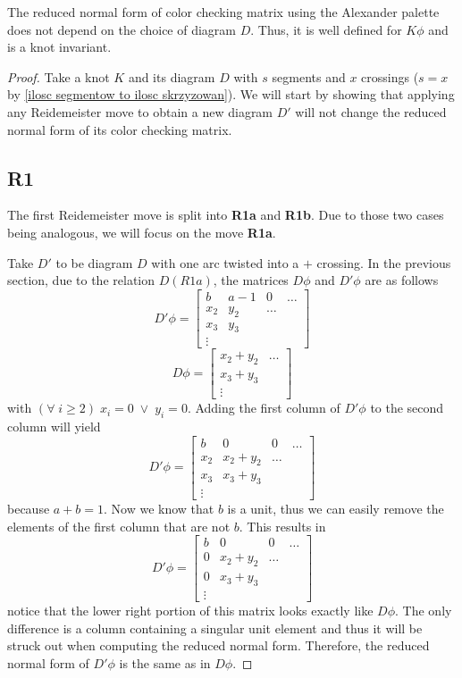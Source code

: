 \begin{theorem}
  The reduced normal form of color checking matrix using the Alexander palette does not depend on the choice of diagram $D$. Thus, it is well defined for $K\phi$ and is a knot invariant.
\end{theorem}

\begin{proof}
  Take a knot $K$ and its diagram $D$ with $s$ segments and $x$ crossings ($s=x$ by \cref{ilosc segmentow to ilosc skrzyzowan}). We will start by showing that applying any Reidemeister move to obtain a new diagram $D'$ will not change the reduced normal form of its color checking matrix.

  \subsection*{\centering R1}

  The first Reidemeister move is split into \textbf{R1a} and \textbf{R1b}. Due to those two cases being analogous, we will focus on the move \textbf{R1a}.

  Take $D'$ to be diagram $D$ with one arc twisted into a $+$ crossing. In the previous section, due to the relation $D(R1a)$, the matrices $D\phi$ and $D'\phi$ are as follows
  $$
  D'\phi=
  \begin{bmatrix}
    b & a-1 & 0 & \hdots\\ 
    x_2 & y_2 & \hdots \\ 
    x_3 & y_3 \\ 
    \vdots 
  \end{bmatrix}
  $$
  $$
  D\phi=
  \begin{bmatrix}
    x_2 + y_2 & \hdots \\ 
    x_3 + y_3 \\ 
    \vdots
  \end{bmatrix}
  $$
  with $(\forall\; i\geq 2)\;x_i=0\;\lor\; y_i=0$. Adding the first column of $D'\phi$ to the second column will yield 
  $$
  D'\phi=
  \begin{bmatrix}
    b & 0 & 0 & \hdots\\ 
    x_2 & x_2+y_2 & \hdots \\ 
    x_3 & x_3+y_3 \\ 
    \vdots 
  \end{bmatrix}
  $$
  because $a+b=1$. Now we know that $b$ is a unit, thus we can easily remove the elements of the first column that are not $b$. This results in 
  $$
  D'\phi=
  \begin{bmatrix}
    b & 0 & 0 & \hdots\\ 
    0 & x_2+y_2 & \hdots \\ 
    0 & x_3+y_3 \\ 
    \vdots 
  \end{bmatrix}
  $$
  notice that the lower right portion of this matrix looks exactly like $D\phi$. The only difference is a column containing a singular unit element and thus it will be struck out when computing the reduced normal form. Therefore, the reduced normal form of $D'\phi$ is the same as in $D\phi$.
  

\end{proof}
